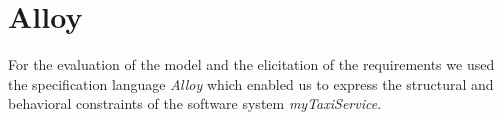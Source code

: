 \section{Alloy}
For the evaluation of the model and the elicitation of the requirements we used the specification language \textit{Alloy} which enabled us to express the structural and behavioral constraints of the software system \textit{myTaxiService}.


